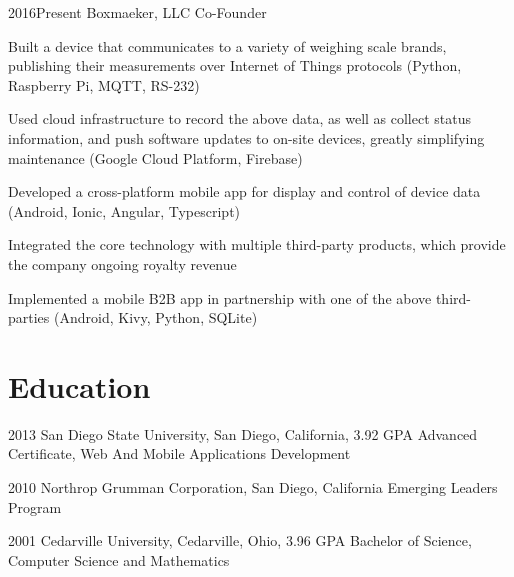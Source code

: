 \documentclass{article}
\begin{document}
\job
  {2016}{Present}
  {Boxmaeker, LLC}
  {Co-Founder}
  {\begin{achievements}
    \item Built a device that communicates to a variety of weighing scale brands, publishing their measurements over Internet of Things protocols (Python, Raspberry Pi, MQTT, RS-232)
    \item Used cloud infrastructure to record the above data, as well as collect status information, and push software updates to on-site devices, greatly simplifying maintenance (Google Cloud Platform, Firebase)
    \item Developed a cross-platform mobile app for display and control of device data (Android, Ionic, Angular, Typescript)
    \item Integrated the core technology with multiple third-party products, which provide the company ongoing royalty revenue
    \item Implemented a mobile B2B app in partnership with one of the above third-parties (Android, Kivy, Python, SQLite)
  \end{achievements}}


\section{Education}

\education
  {2013}
  {San Diego State University, San Diego, California, 3.92 GPA}
  {Advanced Certificate, Web And Mobile Applications Development}

\education
  {2010}
  {Northrop Grumman Corporation, San Diego, California}
  {Emerging Leaders Program}

\education
  {2001}
  {Cedarville University, Cedarville, Ohio, 3.96 GPA}
  {Bachelor of Science, Computer Science and Mathematics}


\section{}

\credits
\end{document}
